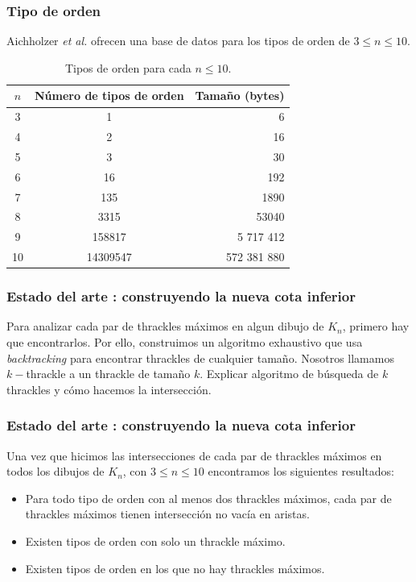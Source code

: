 \begin{frame}
\frametitle{Tipo de orden}
Aichholzer \emph{et al.} ofrecen una base de datos para los tipos de orden de $3 \leq n \leq 10$.
\begin{table}[ht]
	\centering
	\begin{tabular}{|c|c|r|}
		\hline
		$n$ & Número de tipos de orden & Tamaño (bytes)   \\ \hline
		3     & 1                   & 6       \\ \hline
		4     & 2                   & 16      \\ \hline
		5     & 3                   & 30      \\ \hline
		6     & 16                  & 192     \\ \hline
		7     & 135                 & 1890    \\ \hline
		8     & 3315                & 53040   \\ \hline
		9     & 158817              & 5 717 412   \\\hline
		10    & 14309547            & 572 381 880 \\ \hline
	\end{tabular}
	\caption{Tipos de orden para cada $n\leq10$.}
	\label{tab:ots}
\end{table}
\end{frame}
\begin{frame}
\frametitle{Estado del arte : construyendo la nueva cota inferior}
Para analizar cada par de thrackles máximos en algun dibujo de $K_n$, primero hay que encontrarlos. Por ello, construimos un algoritmo 
exhaustivo que usa \emph{backtracking} para encontrar thrackles de cualquier tamaño. Nosotros llamamos $k-$thrackle a un thrackle de tamaño $k$.
Explicar algoritmo de búsqueda de $k$ thrackles y cómo hacemos la intersección.

\end{frame}

\begin{frame}
\frametitle{Estado del arte : construyendo la nueva cota inferior}
Una vez que hicimos las intersecciones de cada par de thrackles máximos en todos los dibujos de $K_n$, con $3 \leq n \leq 10$ encontramos los siguientes resultados:
\begin{itemize}
	\item Para todo tipo de orden con al menos dos thrackles máximos, cada par de thrackles máximos tienen intersección no vacía en aristas.
	\item Existen tipos de orden con solo un thrackle máximo.
	\item Existen tipos de orden en los que no hay thrackles máximos.
\end{itemize}
\end{frame}

